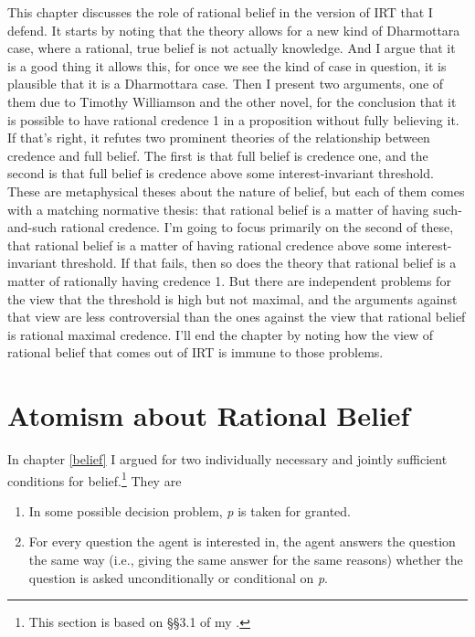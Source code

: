 \documentclass[
  11pt,
]{book}
\providecommand{\tightlist}{%
  \setlength{\itemsep}{0pt}\setlength{\parskip}{0pt}}
\begin{document}
This chapter discusses the role of rational belief in the version of IRT that I defend. It starts by noting that the theory allows for a new kind of Dharmottara case, where a rational, true belief is not actually knowledge. And I argue that it is a good thing it allows this, for once we see the kind of case in question, it is plausible that it is a Dharmottara case. Then I present two arguments, one of them due to Timothy Williamson and the other novel, for the conclusion that it is possible to have rational credence 1 in a proposition without fully believing it. If that's right, it refutes two prominent theories of the relationship between credence and full belief. The first is that full belief is credence one, and the second is that full belief is credence above some interest-invariant threshold. These are metaphysical theses about the nature of belief, but each of them comes with a matching normative thesis: that rational belief is a matter of having such-and-such rational credence. I'm going to focus primarily on the second of these, that rational belief is a matter of having rational credence above some interest-invariant threshold. If that fails, then so does the theory that rational belief is a matter of rationally having credence 1. But there are independent problems for the view that the threshold is high but not maximal, and the arguments against that view are less controversial than the ones against the view that rational belief is rational maximal credence. I'll end the chapter by noting how the view of rational belief that comes out of IRT is immune to those problems.

\hypertarget{atomism}{%
\section{Atomism about Rational Belief}\label{atomism}}

In chapter \ref{belief} I argued for two individually necessary and jointly sufficient conditions for belief.\footnote{This section is based on §§3.1 of my \citeyearpar{Weatherson2012}.} They are

\begin{enumerate}
\def\labelenumi{\arabic{enumi}.}
\tightlist
\item
  In some possible decision problem, \emph{p} is taken for granted.
\item
  For every question the agent is interested in, the agent answers the question the same way (i.e., giving the same answer for the same reasons) whether the question is asked unconditionally or conditional on \emph{p}.
\end{enumerate}
\end{document}
